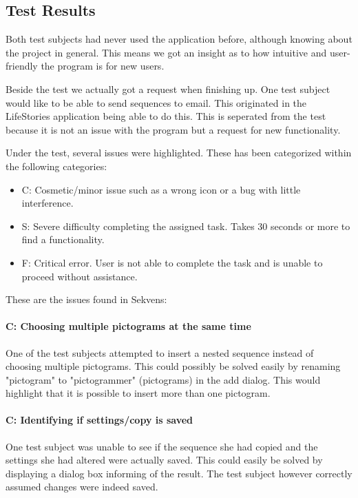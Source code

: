 \subsection{Test Results}\label{subsec:test_results}
Both test subjects had never used the application before, although knowing about the project in general. This means we got an insight as to how intuitive and user-friendly the program is for new users.

Beside the test we actually got a request when finishing up. One test subject would like to be able to send sequences to email. This originated in the LifeStories application being able to do this. This is seperated from the test because it is not an issue with the program but a request for new functionality.

Under the test, several issues were highlighted. These has been categorized within the following categories:

\begin{itemize}
\item C: Cosmetic/minor issue such as a wrong icon or a bug with little interference.
\item S: Severe difficulty completing the assigned task. Takes 30 seconds or more to find a functionality.
\item F: Critical error. User is not able to complete the task and is unable to proceed without assistance.
\end{itemize}

These are the issues found in Sekvens:

\paragraph{C: Choosing multiple pictograms at the same time}
One of the test subjects attempted to insert a nested sequence instead of choosing multiple pictograms. This could possibly be solved easily by renaming "pictogram" to "pictogrammer" (pictograms) in the add dialog. This would highlight that it is possible to insert more than one pictogram.

\paragraph{C: Identifying if settings/copy is saved}
One test subject was unable to see if the sequence she had copied and the settings she had altered were actually saved. This could easily be solved by displaying a dialog box informing of the result. The test subject however correctly assumed changes were indeed saved.

